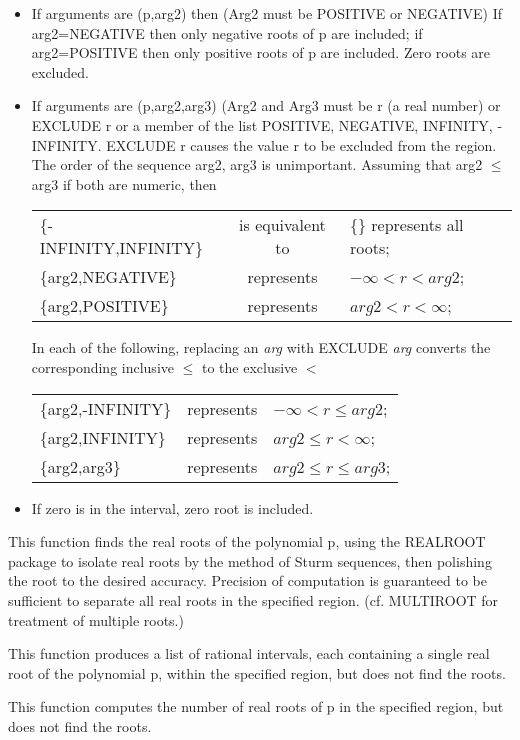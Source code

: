 \begin{itemize}
\item If arguments are (p,arg2) then
(Arg2 must be  POSITIVE or NEGATIVE)  If arg2=NEGATIVE then only
negative roots of p are included; if arg2=POSITIVE then only positive
roots of p are included. Zero roots are excluded.

\item If arguments are (p,arg2,arg3)
   
(Arg2 and Arg3 must be r (a real number) or  EXCLUDE r  or a member of
the list POSITIVE, NEGATIVE, INFINITY, -INFINITY.  EXCLUDE r causes the
value r to be excluded from the region.  The order of the sequence
arg2, arg3 is unimportant.  Assuming that arg2 $\leq$ arg3 if both are
numeric, then

\begin{tabular}{l c l}
\{-INFINITY,INFINITY\} & is equivalent to & \{\} represents all roots; \\
\{arg2,NEGATIVE\} & represents & $-\infty < r < arg2$; \\
\{arg2,POSITIVE\} & represents & $arg2 < r < \infty$;
\end{tabular}

In each of the following, replacing an {\em arg} with EXCLUDE {\em arg}
converts the corresponding inclusive $\leq$ to the exclusive $<$

\begin{tabular}{l c l}
\{arg2,-INFINITY\} & represents & $-\infty < r \leq arg2$; \\
\{arg2,INFINITY\} & represents & $arg2 \leq r < \infty$; \\
\{arg2,arg3\} & represents & $arg2 \leq r \leq arg3$;
\end{tabular}

\item If zero is in the interval, zero root is included.
\end{itemize}

\begin{description}
 
\item[REALROOTS] This function finds the real roots of the polynomial p,
using the REALROOT package to isolate real roots by the method of Sturm
sequences, then polishing the root to the desired accuracy.  Precision
of computation is guaranteed to be sufficient to separate all real roots
in the specified region.  (cf. MULTIROOT for treatment of multiple
roots.)

\item[ISOLATER] This function produces a list of rational intervals, each
containing a single real root of the polynomial p, within the specified
region, but does not find the roots.

\item[RLROOTNO] This function computes the number of real roots of p in
the specified region, but does not find the roots.
\end{description}

